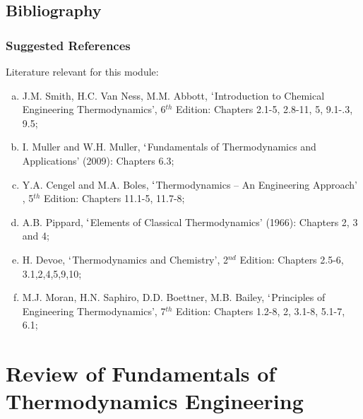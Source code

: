 \documentclass[10pt,compress,handout,unknownkeysallowed]{beamer}
\begin{document}
 \subsection{Bibliography} 
   \begin{frame}
     \frametitle{Suggested References}
       Literature relevant for this module:
     \begin{enumerate}[(a)]
       \item J.M. Smith, H.C. Van Ness, M.M. Abbott, $\lq$Introduction to Chemical Engineering Thermodynamics', 6$^{th}$ Edition: Chapters 2.1-5, 2.8-11, 5, 9.1-.3, 9.5;
       \item I. Muller and W.H. Muller, $\lq$Fundamentals of Thermodynamics and Applications' (2009): Chapters 6.3;
       \item Y.A. Cengel and M.A. Boles, $\lq$Thermodynamics -- An Engineering Approach' , 5$^{th}$ Edition: Chapters 11.1-5, 11.7-8;
       \item A.B. Pippard, $\lq$Elements of Classical Thermodynamics' (1966): Chapters 2, 3 and 4;
       \item H. Devoe, $\lq$Thermodynamics and Chemistry', 2$^{nd}$ Edition: Chapters 2.5-6, 3.1,2,4,5,9,10;
       \item M.J. Moran, H.N. Saphiro, D.D. Boettner, M.B. Bailey, $\lq$Principles of Engineering Thermodynamics', 7$^{th}$ Edition: Chapters 1.2-8, 2, 3.1-8, 5.1-7, 6.1;
     \end{enumerate}
\end{frame}


 \section{Review of Fundamentals of Thermodynamics Engineering}
\end{document}
